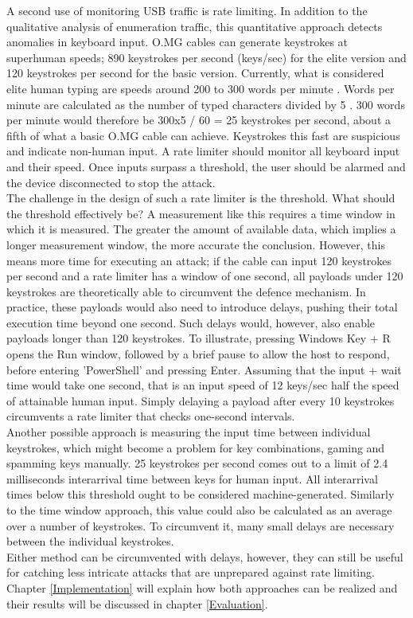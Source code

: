 A second use of monitoring USB traffic is rate limiting. In addition to the qualitative analysis of enumeration traffic, this quantitative approach detects anomalies in keyboard input. O.MG cables can generate keystrokes at superhuman speeds; 890 keystrokes per second (keys/sec) for the elite version and 120 keystrokes per second for the basic version. Currently, what is considered elite human typing are speeds around 200 to 300 words per minute \cite{mythicalrocketTYPING305WPM2023}. Words per minute are calculated as the number of typed characters divided by 5 \cite{travisWhatWordsMinute2015}. 300 words per minute would therefore be 300x5 / 60 = 25 keystrokes per second, about a fifth of what a basic O.MG cable can achieve.
Keystrokes this fast are suspicious and indicate non-human input. A rate limiter should monitor all keyboard input and their speed. Once inputs surpass a threshold, the user should be alarmed and the device disconnected to stop the attack. \\
The challenge in the design of such a rate limiter is the threshold. What should the threshold effectively be? A measurement like this requires a time window in which it is measured. The greater the amount of available data, which implies a longer measurement window, the more accurate the conclusion. However, this means more time for executing an attack; if the cable can input 120 keystrokes per second and a rate limiter has a window of one second, all payloads under 120 keystrokes are theoretically able to circumvent the defence mechanism. In practice, these payloads would also need to introduce delays, pushing their total execution time beyond one second.
Such delays would, however, also enable payloads longer than 120 keystrokes. To illustrate, pressing Windows Key + R opens the Run window, followed by a brief pause to allow the host to respond, before entering 'PowerShell' and pressing Enter. Assuming that the input + wait time would take one second, that is an input speed of 12 keys/sec half the speed of attainable human input. Simply delaying a payload after every 10 keystrokes circumvents a rate limiter that checks one-second intervals.\\
Another possible approach is measuring the input time between individual keystrokes, which might become a problem for key combinations, gaming and spamming keys manually. 25 keystrokes per second comes out to a limit of 2.4 milliseconds interarrival time between keys for human input. All interarrival times below this threshold ought to be considered machine-generated. Similarly to the time window approach, this value could also be calculated as an average over a number of keystrokes. To circumvent it, many small delays are necessary between the individual keystrokes.\\
Either method can be circumvented with delays, however, they can still be useful for catching less intricate attacks that are unprepared against rate limiting.
Chapter \ref{Implementation} will explain how both approaches can be realized and their results will be discussed in chapter \ref{Evaluation}.


